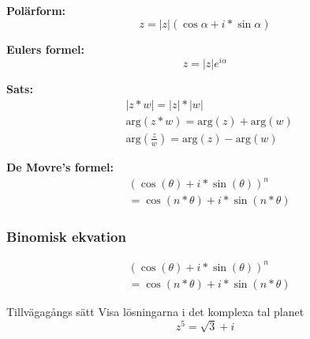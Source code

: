 \begin{multicols}{2}
\textbf{Polärform:}
\begin{equation*}
  z = |z|(\cos{\alpha} + i * \sin{\alpha})
\end{equation*}

\textbf{Eulers formel:}
\begin{equation*}
  z = |z|e^{i \alpha}
\end{equation*}

\textbf{Sats:}
\begin{align*}
  &|z * w| = |z| * |w| \\
  &\text{arg}(z * w) = \text{arg}(z) + \text{arg}(w) \\
  &\text{arg}(\frac{z}{w}) =  \text{arg}(z) - \text{arg}(w)
\end{align*}

\noindent\textbf{De Movre's formel:}
\begin{align*}
  &(\cos{(\theta)} + i * \sin{(\theta)})^{n} \\
  &= \cos{(n*\theta)} + i * \sin{(n*\theta)}
\end{align*}


\subsubsection{Binomisk ekvation}
\begin{align*}
  &(\cos{(\theta)} + i * \sin{(\theta)})^{n} \\
  &= \cos{(n*\theta)} + i * \sin{(n*\theta)}
\end{align*}


\begin{exampleblock}{Tillvägagångs sätt}
Visa lösningarna i det komplexa tal planet
\begin{equation*}
  z^5 = \sqrt{3} + i
\end{equation*}


\end{exampleblock}
\end{multicols}
